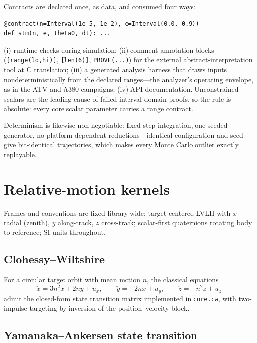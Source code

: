 \documentclass[11pt]{article}
\begin{document}
Contracts are declared once, as data, and consumed four ways:
\begin{center}
\begin{verbatim}
@contract(n=Interval(1e-5, 1e-2), e=Interval(0.0, 0.9))
def stm(n, e, theta0, dt): ...
\end{verbatim}
\end{center}
(i) runtime checks during simulation; (ii) comment-annotation blocks
(\texttt{[range(lo,hi)]}, \texttt{[len(6)]}, \texttt{PROVE(...)}) for the
external abstract-interpretation tool at C translation; (iii) a generated
analysis harness that draws inputs nondeterministically from the declared
ranges---the analyzer's operating envelope, as in the ATV and A380
campaigns; (iv) API documentation. Unconstrained scalars are the leading
cause of failed interval-domain proofs, so the rule is absolute: every core
scalar parameter carries a range contract.

Determinism is likewise non-negotiable: fixed-step integration, one seeded
generator, no platform-dependent reductions---identical configuration and
seed give bit-identical trajectories, which makes every Monte Carlo outlier
exactly replayable.

\section{Relative-motion kernels}
\label{sec:kernels}

Frames and conventions are fixed library-wide: target-centered LVLH with
$x$ radial (zenith), $y$ along-track, $z$ cross-track; scalar-first
quaternions rotating body to reference; SI units throughout.

\subsection{Clohessy--Wiltshire}

For a circular target orbit with mean motion $n$, the classical equations
\cite{clohessy1960}
\begin{equation}
\ddot x = 3n^2x + 2n\dot y + u_x,\qquad
\ddot y = -2n\dot x + u_y,\qquad
\ddot z = -n^2 z + u_z
\end{equation}
admit the closed-form state transition matrix implemented in
\texttt{core.cw}, with two-impulse targeting by inversion of the
position--velocity block.

\subsection{Yamanaka--Ankersen state transition}
\end{document}
